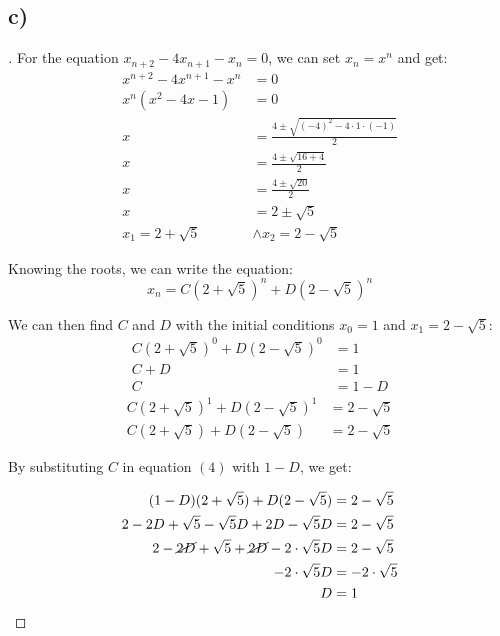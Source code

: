 \documentclass{article}
\begin{document}
\subsection*{c)}
\begin{proof}[\nopunct]
For the equation $x_{n+2} - 4x_{n+1} - x_n = 0$, we can set $x_n = x^n$ and get:
\begin{equation}
    \begin{split}
        x^{n+2} - 4x^{n+1} - x^n &= 0 \\
        x^n(x^{2} - 4x - 1) &= 0 \\
        x &= \frac{4 \pm \sqrt{(-4)^2 - 4 \cdot 1 \cdot (-1)}}{2} \\
        x &= \frac{4 \pm \sqrt{16 + 4}}{2} \\
        x &= \frac{4 \pm \sqrt{20}}{2} \\
        x &= 2 \pm \sqrt{5} \\
        x_1 = 2 + \sqrt{5} & \wedge x_2 = 2 - \sqrt{5}
    \end{split}
\end{equation}

Knowing the roots, we can write the equation:
\begin{equation}
    x_n = C(2 + \sqrt{5})^n + D(2 - \sqrt{5})^n
\end{equation}

We can then find $C$ and $D$ with the initial conditions $x_0 = 1$ and $x_1 = 2 - \sqrt{5}$:
\begin{equation}
    \begin{split}
        C(2 + \sqrt{5})^0 + D(2 - \sqrt{5})^0 &= 1 \\
                                        C + D &= 1 \\
                                            C &= 1 - D
    \end{split}
\end{equation}
\begin{equation}
    \begin{split}
        C(2 + \sqrt{5})^1 + D(2 - \sqrt{5})^1 &= 2 - \sqrt{5} \\
            C(2 + \sqrt{5}) + D(2 - \sqrt{5}) &= 2 - \sqrt{5}
    \end{split}
\end{equation}

By substituting $C$ in equation $(4)$ with $1 - D$, we get:

\begin{equation}
    \begin{split}
                               (1 - D)(2 + \sqrt{5}) + D(2 - \sqrt{5}) &= 2 - \sqrt{5} \\
                        2 - 2D + \sqrt{5} - \sqrt{5}D + 2D - \sqrt{5}D &= 2 - \sqrt{5} \\
          2 - \cancel{2D} + \sqrt{5} + \cancel{2D} - 2 \cdot \sqrt{5}D &= 2 - \sqrt{5} \\
                                                   - 2 \cdot \sqrt{5}D &= - 2 \cdot \sqrt{5} \\
                                                                     D &= 1
    \end{split}
\end{equation}


\end{proof}
\end{document}
